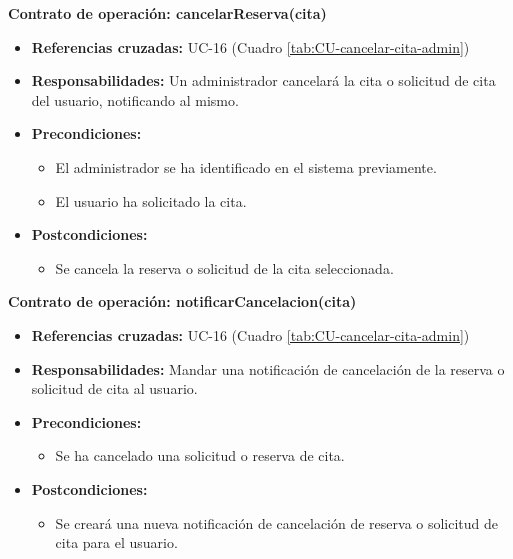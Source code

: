 \textbf{Contrato de operación: cancelarReserva(cita)}
\begin{itemize}
\item \textbf{Referencias cruzadas:} UC-16 (Cuadro \ref{tab:CU-cancelar-cita-admin})
\item \textbf{Responsabilidades:} Un administrador cancelará la cita o solicitud de cita del usuario, notificando al mismo.
\item \textbf{Precondiciones:} 
 \begin{itemize}
\item El administrador se ha identificado en el sistema previamente.
\item El usuario ha solicitado la cita.
\end {itemize}
\item \textbf{Postcondiciones:} 
 \begin{itemize}
\item Se cancela la reserva o solicitud de la cita seleccionada.
\end {itemize}
\end {itemize}

\textbf{Contrato de operación: notificarCancelacion(cita)}
\begin{itemize}
\item \textbf{Referencias cruzadas:} UC-16 (Cuadro \ref{tab:CU-cancelar-cita-admin})
\item \textbf{Responsabilidades:} Mandar una notificación de cancelación de la reserva o solicitud de cita al usuario.
\item \textbf{Precondiciones:} 
 \begin{itemize}
\item Se ha cancelado una solicitud o reserva de cita.
\end {itemize}
\item \textbf{Postcondiciones:} 
 \begin{itemize}
\item Se creará una nueva notificación de cancelación de reserva o solicitud de cita para el usuario.
\end {itemize}
\end {itemize}

